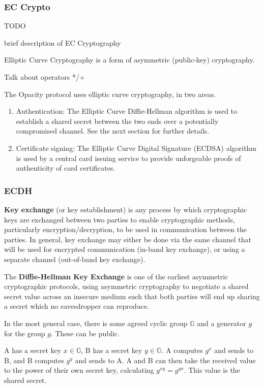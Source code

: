 \documentclass[12pt]{article}
\begin{document}
\subsubsection{EC Crypto}
TODO

brief description of EC Cryptography

Elliptic Curve Cryptography is a form of asymmetric (public-key) cryptography. 

Talk about operators */+

The Opacity protocol uses elliptic curve cryptography, in two areas.
\begin{enumerate}
	\item Authentication: The Elliptic Curve Diffie-Hellman algorithm is used to establish a shared secret between the two ends over a potentially compromised channel. See the next section for further details.
	
	\item Certificate signing: The Elliptic Curve Digital Signature (ECDSA) algorithm is used by a central card issuing service to provide unforgeable proofs of authenticity of card certificates.
\end{enumerate}


\subsubsection{ECDH}
\label{subsec:diffie_hellman}

\textbf{Key exchange }(or key establishment) is any process by which cryptographic keys are exchanged between two parties to enable cryptographic methods, particularly encryption/decryption, to be used in communication between the parties. In general, key exchange may either be done via the same channel that will be used for  encrypted communication (in-band key exchange), or using a separate channel (out-of-band key exchange). 

The \textbf{Diffie-Hellman Key Exchange} is one of the earliest asymmetric cryptographic protocols, using asymmetric cryptography to negotiate a shared secret value across an insecure medium such that both parties will end up sharing a secret which no eavesdropper can reproduce.

In the most general case, there is some agreed cyclic group $\mathbb{G}$ and a generator $g$ for the group $g$. These can be public. 

A has a secret key $x \in \mathbb{G}$, B has a secret key $y \in \mathbb{G}$. A computes $g^x$ and sends to B, and B computes $g^y$ and sends to A. A and B can then take the received value to the power of their own secret key, calculating $g^{xy}=g^{yx}$. This value is the shared secret.
\end{document}

